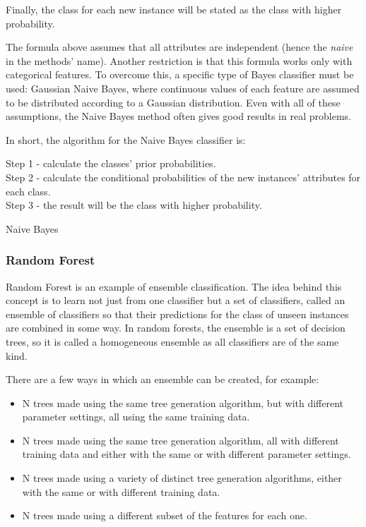 Finally, the class for each new instance will be stated as the class with higher probability.

The formula above assumes that all attributes are independent (hence the \emph{naive} in the methods' name). Another restriction is that this formula works only with categorical features. To overcome this, a specific type of Bayes classifier must be used: Gaussian Naive Bayes, where continuous values of each feature are assumed to be distributed according to a Gaussian distribution. Even with all of these assumptions, the Naive Bayes method often gives good results in real problems.

In short, the algorithm for the Naive Bayes classifier is:

\begin{algorithm}[H]
Step 1 - calculate the classes' prior probabilities. \\
Step 2 - calculate the conditional probabilities of the new instances' attributes for each class. \\
Step 3 - the result will be the class with higher probability.
\caption{Naive Bayes}
\end{algorithm}

\subsubsection{Random Forest}

Random Forest is an example of ensemble classification. The idea behind this concept is to learn not just from one classifier but a set of classifiers, called an ensemble of classifiers so that their predictions for the class of unseen instances are combined in some way. In random forests, the ensemble is a set of decision trees, so it is called a homogeneous ensemble as all classifiers are of the same kind.

There are a few ways in which an ensemble can be created, for example:

\begin{itemize}
    \item N trees made using the same tree generation algorithm, but with different parameter settings, all using the same training data.
    \item N trees made using the same tree generation algorithm, all with different training data and either with the same or with different parameter settings.
    \item N trees made using a variety of distinct tree generation algorithms, either with the same or with different training data.
    \item N trees made using a different subset of the features for each one.
\end{itemize}


